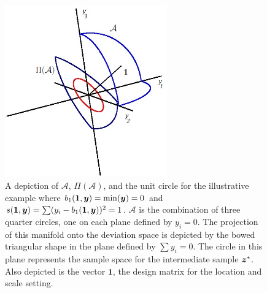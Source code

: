 \documentclass[ba]{imsart}
\newcommand{\by}{\mbox{\boldmath $y$}}
\newcommand{\bz}{\mbox{\boldmath $z$}}
\newcommand{\mc}{\mathcal}
\newcommand{\green}[1]{{\color{green}#1}}
\begin{document}
\begin{figure}[t]
\centering
\includegraphics[width=2.75in]{minSS3dSampleSpace.jpg}
\caption{A depiction of $\mathcal{A}$, $\Pi(\mathcal{A})$, and the
  unit circle for the illustrative example where $b_{1}(\mathbf{1},\by)=\min(\by)=0$ and
  $s(\mathbf{1},\by)=\sum (y_i -b_{1}(\mathbf{1},\by))^2 =1$.
$\mathcal{A}$ is the combination of three quarter circles, one
  on each plane defined by $y_i=0$. The projection of this manifold
  onto the deviation space is depicted by the bowed triangular shape
  in the plane defined by $\sum y_i=0$. The circle in this plane
  represents the sample space for the intermediate sample $\bz^*$. Also
  depicted is the vector $\mathbf{1}$, the design matrix for the
  location and scale setting.}
\label{fig:sampSpace}
\end{figure}


%
%
%
\end{document}
